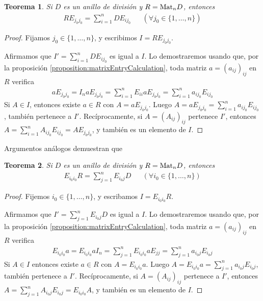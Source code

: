 \documentclass{report}
\newcommand{\Mat}{\textnormal{Mat}}
\newtheorem{theorem}{Teorema}
\begin{document}
  \begin{theorem}
    \label{theorem:matricesWhereAlmostEveryColumnIsNull}
    Si \(D\) es un anillo de división y \(R = \Mat_n D\), entonces 
    \begin{align}
      R E_{j_0 j_0}
      =
      \sum_{i = 1}^n D E_{i j_0}
      &&(\forall j_0 \in \{1, \dots, n\})
    \end{align}
  \end{theorem}
  \begin{proof}
    Fijamos \(j_0 \in \{1, \dots, n\}\), y escribimos \(I = R E_{j_0 j_0}\).

    Afirmamos que \(I' = \sum_{i = 1}^n D E_{i j_0}\) es igual a \(I\).
    Lo demostraremos usando que, por la proposición \ref{proposition:matrixEntryCalculation}, toda matriz \(a = (a_{i j})_{i j}\) en \(R\) verifica
    \begin{align}
      a E_{j_0 j_0}
      =
      I_n a E_{j_0 j_0}
      =
      \sum_{i = 1}^n E_{i i} a E_{j_0 j_0}
      =
      \sum_{i = 1}^n a_{i j_0} E_{i j_0}
    \end{align}
    Si \(A \in I\), entonces existe \(a \in R\) con \(A = a E_{j_0 j_0}\).
    Luego \(A = a E_{j_0 j_0} = \sum_{i = 1}^n a_{i j_0} E_{i j_0}\), también pertenece a \(I'\).
    Recíprocamente, si \(A = (A_{i j})_{i j}\) pertenece \(I'\), entonces \(A = \sum_{i = 1}^n A_{i j_0} E_{i j_0} = A E_{j_0 j_0}\), y también es un elemento de \(I\).
  \end{proof}

  Argumentos análogos demuestran que
  \begin{theorem}
    \label{theorem:matricesWhereAlmostEveryRowIsNull}
    Si \(D\) es un anillo de división y \(R = \Mat_n D\), entonces
    \begin{align}
      \displaystyle
      E_{i_0 i_0} R
      =
      \sum_{j = 1}^n E_{i_0 j} D
      &&(\forall i_0 \in \{1, \dots, n\})
    \end{align}
  \end{theorem}
  \begin{proof}
    Fijemos \(i_0 \in \{1, \dots, n\}\), y escribamos \(I = E_{i_0 i_0} R\).

    Afirmamos que \(I' = \sum_{j = 1}^n E_{i_0 j} D\) es igual a \(I\).
    Lo demostraremos usando que, por la proposición \ref{proposition:matrixEntryCalculation}, toda matriz \(a = (a_{i j})_{i j}\) en \(R\) verifica
    \begin{align}
      E_{i_0 i_0} a
      =
      E_{i_0 i_0} a I_n
      =
      \sum_{j = 1}^n E_{i_0 i_0} a E_{j j}
      =
      \sum_{j = 1}^n a_{i_0 j} E_{i_0 j}
    \end{align}
    Si \(A \in I\) entonces existe \(a \in R\) con \(A = E_{i_0 i_0} a\).
    Luego \(A = E_{i_0 i_0} a = \sum_{j = 1}^n a_{i_0 j} E_{i_0 j}\), también pertenece a \(I'\).
    Recíprocamente, si \(A = (A_{i j})_{i j}\) pertenece a \(I'\), entonces \(A = \sum_{j = 1}^n A_{i_0 j} E_{i_0 j} = E_{i_0 i_0} A\), y también es un elemento de \(I\).
  \end{proof}
\end{document}
